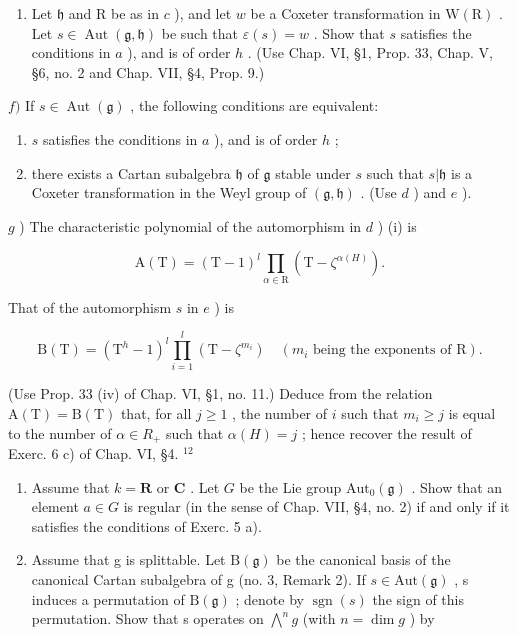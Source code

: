 \begin{enumerate}
\def\labelenumi{\alph{enumi})}
\setcounter{enumi}{4}
\tightlist
\item
  Let \(\mathfrak{h}\) and \(\mathrm{R}\) be as in \(c\) ), and let \(w\) be a Coxeter transformation in \(\mathrm{W(R)}\) . Let \(s \in \operatorname{Aut}(\mathfrak{g}, \mathfrak{h})\) be such that \(\varepsilon(s) = w\) . Show that \(s\) satisfies the conditions in \(a\) ), and is of order \(h\) . (Use Chap. VI, §1, Prop. 33, Chap. V, §6, no. 2 and Chap. VII, §4, Prop. 9.)
\end{enumerate}

\(f)\) If \(s \in \operatorname{Aut}(\mathfrak{g})\) , the following conditions are equivalent:

\begin{enumerate}
\def\labelenumi{(\roman{enumi})}
\item
  \(s\) satisfies the conditions in \(a\) ), and is of order \(h\) ;
\item
  there exists a Cartan subalgebra \(\mathfrak{h}\) of \(\mathfrak{g}\) stable under \(s\) such that \(s|\mathfrak{h}\) is a Coxeter transformation in the Weyl group of \((\mathfrak{g},\mathfrak{h})\) . (Use \(d\) ) and \(e\) ).
\end{enumerate}

\(g\) ) The characteristic polynomial of the automorphism in \(d\) ) (i) is

\[
\mathrm{A} (\mathrm{T}) = (\mathrm{T} - 1) ^ {l} \prod_ {\alpha \in \mathrm{R}} (\mathrm{T} - \zeta^ {\alpha (H)}).
\]

That of the automorphism \(s\) in \(e\) ) is

\[
\mathrm{B} (\mathrm{T}) = \left(\mathrm{T} ^ {h} - 1\right) ^ {l} \prod_ {i = 1} ^ {l} \left(\mathrm{T} - \zeta^ {m _ {i}}\right) \quad \left(m _ {i} \text { being   the   exponents   of } \mathrm{R}\right).
\]

(Use Prop. 33 (iv) of Chap. VI, §1, no. 11.) Deduce from the relation \(\mathrm{A(T)} = \mathrm{B(T)}\) that, for all \(j \geq 1\) , the number of \(i\) such that \(m_i \geq j\) is equal to the number of \(\alpha\in R_{+}\) such that \(\alpha(H)=j\) ; hence recover the result of Exerc. 6 c) of Chap. VI, §4. \(^{12}\)

\begin{enumerate}
\def\labelenumi{\arabic{enumi})}
\setcounter{enumi}{5}
\item
  Assume that \(k = \mathbf{R}\) or \(\mathbf{C}\) . Let \(G\) be the Lie group \(\mathrm{Aut}_0(\mathfrak{g})\) . Show that an element \(a \in G\) is regular (in the sense of Chap. VII, §4, no. 2) if and only if it satisfies the conditions of Exerc. 5 a).
\item
  Assume that g is splittable. Let \(\mathrm{B}(\mathfrak{g})\) be the canonical basis of the canonical Cartan subalgebra of g (no. 3, Remark 2). If \(s \in \mathrm{Aut}(\mathfrak{g})\) , s induces a permutation of \(\mathrm{B}(\mathfrak{g})\) ; denote by \(\operatorname{sgn}(s)\) the sign of this permutation. Show that s operates on \(\bigwedge^{n} g\) (with \(n = \dim g\) ) by
\end{enumerate}

